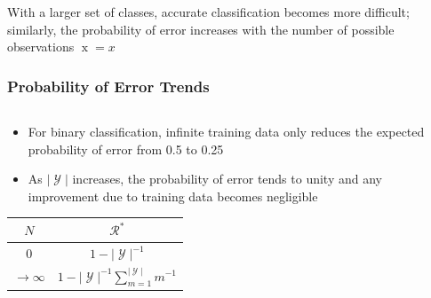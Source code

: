 \documentclass{beamer}
\DeclareMathOperator{\xrm}{\mathrm{x}}
\DeclareMathOperator{\Ycal}{\mathcal{Y}}
\DeclareMathOperator{\Rcal}{\mathcal{R}}
\begin{document}
\begin{frame}
\begin{columns}[c]
\begin{column}{.5\linewidth}
\end{column}

\end{columns}

With a larger set of classes, accurate classification becomes more difficult; similarly, the probability of error increases with the number of possible observations $\xrm = x$

\end{frame}




\begin{frame}
\frametitle{Probability of Error Trends}

\begin{columns}[c]

\begin{column}{.5\linewidth}

\begin{itemize}
\item For binary classification, infinite training data only reduces the expected probability of error from 0.5 to 0.25
\item As $|\Ycal|$ increases, the probability of error tends to unity and any improvement due to training data becomes negligible
\end{itemize}

\begin{table}
\begin{tabular}{| c | c |}
\hline 
$N$ & $\Rcal^*$ \\
\hline \hline
$0$ & $1 - |\Ycal|^{-1}$  \\ 
\hline
$\to \infty$ & $1 - |\Ycal|^{-1} \sum_{m=1}^{|\Ycal|} m^{-1}$ \\
\hline
\end{tabular}
\end{table}

\end{column}

\begin{column}{.5\linewidth}


\end{column}
\end{columns}
\end{frame}
\end{document}
